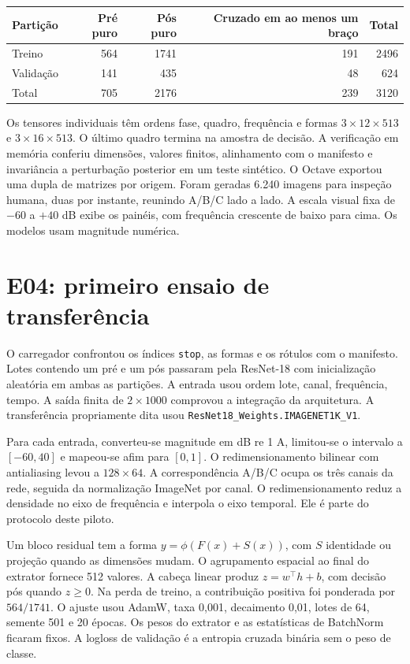 \documentclass[11pt,a4paper]{article}
\newcommand{\codigo}[1]{\texttt{#1}}
\begin{document}
\begin{center}
\begin{tabular}{@{}lrrrr@{}}\toprule
Partição & Pré puro & Pós puro & Cruzado em ao menos um braço & Total\\\midrule
Treino & 564 & 1741 & 191 & 2496\\
Validação & 141 & 435 & 48 & 624\\
Total & 705 & 2176 & 239 & 3120\\\bottomrule
\end{tabular}
\end{center}
Os tensores individuais têm ordens fase, quadro, frequência e formas $3\times12\times513$ e $3\times16\times513$. O último quadro termina na amostra de decisão. A verificação em memória conferiu dimensões, valores finitos, alinhamento com o manifesto e invariância a perturbação posterior em um teste sintético. O Octave exportou uma dupla de matrizes por origem. Foram geradas 6.240 imagens para inspeção humana, duas por instante, reunindo A/B/C lado a lado. A escala visual fixa de $-60$ a $+40$ dB exibe os painéis, com frequência crescente de baixo para cima. Os modelos usam magnitude numérica.

\section{E04: primeiro ensaio de transferência}
O carregador confrontou os índices \codigo{stop}, as formas e os rótulos com o manifesto. Lotes contendo um pré e um pós passaram pela ResNet-18 com inicialização aleatória em ambas as partições. A entrada usou ordem lote, canal, frequência, tempo. A saída finita de $2\times1000$ comprovou a integração da arquitetura. A transferência propriamente dita usou \codigo{ResNet18\_Weights.IMAGENET1K\_V1}.

Para cada entrada, converteu-se magnitude em dB re 1 A, limitou-se o intervalo a $[-60,40]$ e mapeou-se afim para $[0,1]$. O redimensionamento bilinear com antialiasing levou a $128\times64$. A correspondência A/B/C ocupa os três canais da rede, seguida da normalização ImageNet por canal. O redimensionamento reduz a densidade no eixo de frequência e interpola o eixo temporal. Ele é parte do protocolo deste piloto.

Um bloco residual tem a forma $y=\phi(F(x)+S(x))$, com $S$ identidade ou projeção quando as dimensões mudam. O agrupamento espacial ao final do extrator fornece 512 valores. A cabeça linear produz $z=w^\top h+b$, com decisão pós quando $z\ge0$. Na perda de treino, a contribuição positiva foi ponderada por $564/1741$. O ajuste usou AdamW, taxa 0,001, decaimento 0,01, lotes de 64, semente 501 e 20 épocas. Os pesos do extrator e as estatísticas de BatchNorm ficaram fixos. A logloss de validação é a entropia cruzada binária sem o peso de classe.
\end{document}
